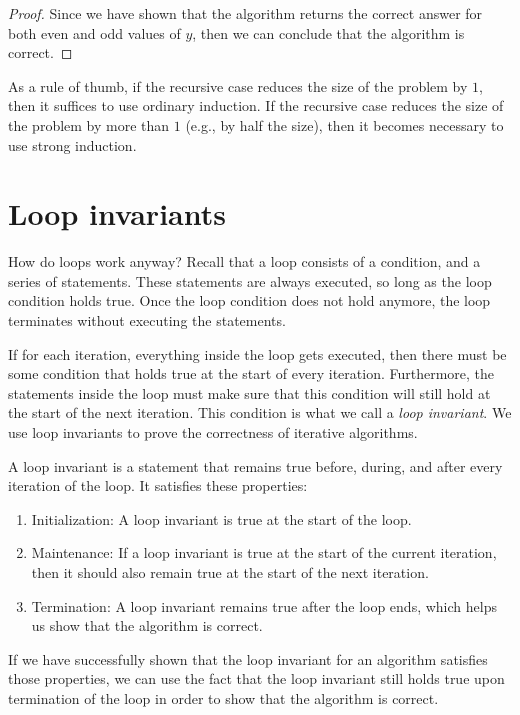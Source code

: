 \begin{example}
\begin{proof}
        Since we have shown that the algorithm returns the correct answer for both even and odd values of $y$, then we can conclude that the algorithm is correct.
    \end{proof}
\end{example}

As a rule of thumb, if the recursive case reduces the size of the problem by $1$, then it suffices to use ordinary induction. If the recursive case reduces the size of the problem by more than $1$ (e.g., by half the size), then it becomes necessary to use strong induction.

\section{Loop invariants}
How do loops work anyway? Recall that a loop consists of a condition, and a series of statements. These statements are always executed, so long as the loop condition holds true. Once the loop condition does not hold anymore, the loop terminates without executing the statements.

If for each iteration, everything inside the loop gets executed, then there must be some condition that holds true at the start of every iteration. Furthermore, the statements inside the loop must make sure that this condition will still hold at the start of the next iteration. This condition is what we call a \textit{loop invariant}. We use loop invariants to prove the correctness of iterative algorithms.

\begin{definition}
A loop invariant is a statement that remains true before, during, and after every iteration of the loop. It satisfies these properties:
\begin{enumerate}
    \item Initialization: A loop invariant is true at the start of the loop.
    \item Maintenance: If a loop invariant is true at the start of the current iteration, then it should also remain true at the start of the next iteration.
    \item Termination: A loop invariant remains true after the loop ends, which helps us show that the algorithm is correct.
\end{enumerate}
\end{definition}

If we have successfully shown that the loop invariant for an algorithm satisfies those properties, we can use the fact that the loop invariant still holds true upon termination of the loop in order to show that the algorithm is correct.

